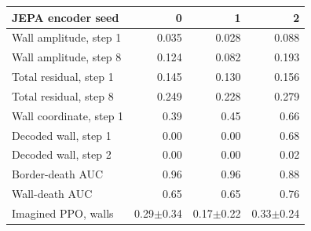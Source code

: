 \begin{tabular}{lrrr}
\toprule
JEPA encoder seed & 0 & 1 & 2 \\
\midrule
Wall amplitude, step 1 & 0.035 & 0.028 & 0.088 \\
Wall amplitude, step 8 & 0.124 & 0.082 & 0.193 \\
Total residual, step 1 & 0.145 & 0.130 & 0.156 \\
Total residual, step 8 & 0.249 & 0.228 & 0.279 \\
Wall coordinate, step 1 & 0.39 & 0.45 & 0.66 \\
Decoded wall, step 1 & 0.00 & 0.00 & 0.68 \\
Decoded wall, step 2 & 0.00 & 0.00 & 0.02 \\
Border-death AUC & 0.96 & 0.96 & 0.88 \\
Wall-death AUC & 0.65 & 0.65 & 0.76 \\
Imagined PPO, walls & 0.29$\pm$0.34 & 0.17$\pm$0.22 & 0.33$\pm$0.24 \\
\bottomrule
\end{tabular}
